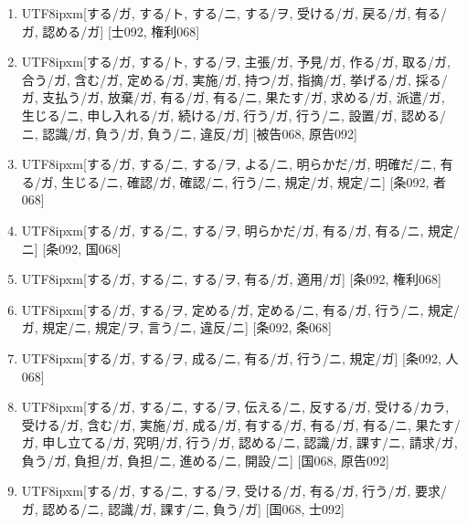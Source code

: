 \begin{enumerate}
\item \begin{CJK}{UTF8}{ipxm}[する/ガ, する/ト, する/ニ, する/ヲ, 受ける/ガ, 戻る/ガ, 有る/ガ, 認める/ガ] [士092, 権利068]\end{CJK}
\item \begin{CJK}{UTF8}{ipxm}[する/ガ, する/ト, する/ヲ, 主張/ガ, 予見/ガ, 作る/ガ, 取る/ガ, 合う/ガ, 含む/ガ, 定める/ガ, 実施/ガ, 持つ/ガ, 指摘/ガ, 挙げる/ガ, 採る/ガ, 支払う/ガ, 放棄/ガ, 有る/ガ, 有る/ニ, 果たす/ガ, 求める/ガ, 派遣/ガ, 生じる/ニ, 申し入れる/ガ, 続ける/ガ, 行う/ガ, 行う/ニ, 設置/ガ, 認める/ニ, 認識/ガ, 負う/ガ, 負う/ニ, 違反/ガ] [被告068, 原告092]\end{CJK}
\item \begin{CJK}{UTF8}{ipxm}[する/ガ, する/ニ, する/ヲ, よる/ニ, 明らかだ/ガ, 明確だ/ニ, 有る/ガ, 生じる/ニ, 確認/ガ, 確認/ニ, 行う/ニ, 規定/ガ, 規定/ニ] [条092, 者068]\end{CJK}
\item \begin{CJK}{UTF8}{ipxm}[する/ガ, する/ニ, する/ヲ, 明らかだ/ガ, 有る/ガ, 有る/ニ, 規定/ニ] [条092, 国068]\end{CJK}
\item \begin{CJK}{UTF8}{ipxm}[する/ガ, する/ニ, する/ヲ, 有る/ガ, 適用/ガ] [条092, 権利068]\end{CJK}
\item \begin{CJK}{UTF8}{ipxm}[する/ガ, する/ヲ, 定める/ガ, 定める/ニ, 有る/ガ, 行う/ニ, 規定/ガ, 規定/ニ, 規定/ヲ, 言う/ニ, 違反/ニ] [条092, 条068]\end{CJK}
\item \begin{CJK}{UTF8}{ipxm}[する/ガ, する/ヲ, 成る/ニ, 有る/ガ, 行う/ニ, 規定/ガ] [条092, 人068]\end{CJK}
\item \begin{CJK}{UTF8}{ipxm}[する/ガ, する/ニ, する/ヲ, 伝える/ニ, 反する/ガ, 受ける/カラ, 受ける/ガ, 含む/ガ, 実施/ガ, 成る/ガ, 有する/ガ, 有る/ガ, 有る/ニ, 果たす/ガ, 申し立てる/ガ, 究明/ガ, 行う/ガ, 認める/ニ, 認識/ガ, 課す/ニ, 請求/ガ, 負う/ガ, 負担/ガ, 負担/ニ, 進める/ニ, 開設/ニ] [国068, 原告092]\end{CJK}
\item \begin{CJK}{UTF8}{ipxm}[する/ガ, する/ニ, する/ヲ, 受ける/ガ, 有る/ガ, 行う/ガ, 要求/ガ, 認める/ニ, 認識/ガ, 課す/ニ, 負う/ガ] [国068, 士092]\end{CJK}

\end{enumerate}

